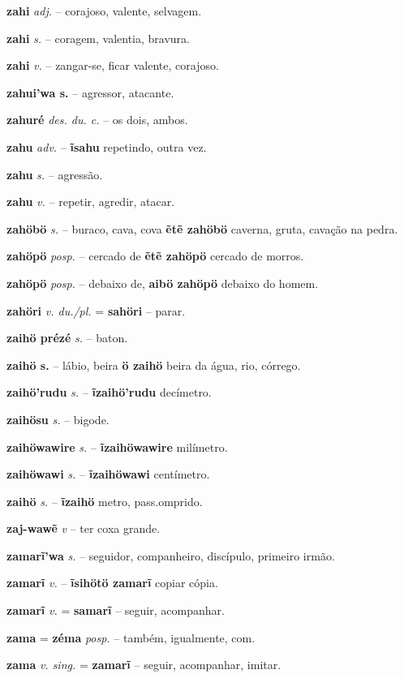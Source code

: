 \textbf{zahi} \textit{adj.} -- corajoso, valente, selvagem.

\textbf{zahi} \textit{s.} -- coragem, valentia, bravura.

\textbf{zahi} \textit{v.} -- zangar-se, ficar valente, corajoso.

\textbf{zahui'wa s.} -- agressor, atacante.

\textbf{zahuré} \textit{des. du. c.} -- os dois, ambos.

\textbf{zahu} \textit{adv.} -- \textbf{ĩsahu} repetindo, outra vez.

\textbf{zahu} \textit{s.} -- agressão.

\textbf{zahu} \textit{v.} -- repetir, agredir, atacar.

\textbf{zahöbö} \textit{s.} -- buraco, cava, cova  \textbf{ẽtẽ zahöbö} caverna, gruta, cavação na pedra.

\textbf{zahöpö} \textit{posp.} -- cercado de  \textbf{ẽtẽ zahöpö} cercado de morros.

\textbf{zahöpö} \textit{posp.} -- debaixo de, \textbf{aibö zahöpö} debaixo do homem.

\textbf{zahöri} \textit{v. du./pl.} = \textbf{sahöri} -- parar.

\textbf{zaihö prézé} \textit{s.} -- baton.

\textbf{zaihö s.} -- lábio, beira  \textbf{ö zaihö} beira da água, rio, córrego.

\textbf{zaihö'rudu} \textit{s.} -- \textbf{ĩzaihö'rudu} decímetro.

\textbf{zaihösu} \textit{s.} -- bigode.

\textbf{zaihöwawire} \textit{s.} -- \textbf{ĩzaihöwawire} milímetro.

\textbf{zaihöwawi} \textit{s.} -- \textbf{ĩzaihöwawi} centímetro.

\textbf{zaihö} \textit{s.} -- \textbf{ĩzaihö} metro, pass.omprido.

\textbf{zaj-wawẽ} \textit{v} -- {ter coxa grande}.

\textbf{zamarĩ'wa} \textit{s.} -- seguidor, companheiro, discípulo, primeiro irmão.

\textbf{zamarĩ} \textit{v.} -- \textbf{ĩsihötö zamarĩ} copiar  cópia.

\textbf{zamarĩ} \textit{v.} = \textbf{samarĩ} -- seguir, acompanhar.

\textbf{zama} = \textbf{zéma} \textit{posp.} -- também, igualmente, com.

\textbf{zama} \textit{v. sing.} = \textbf{zamarĩ} -- seguir, acompanhar, imitar.

